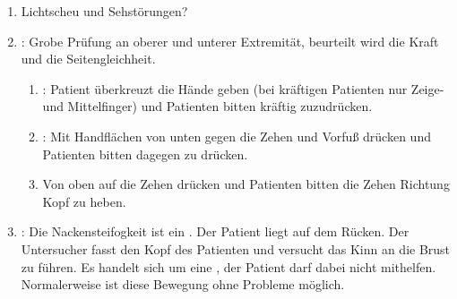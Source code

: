 {\begin{enumerate}
\begin{enumerate}
    Beurteilung von:
    \begin{enumerate}
      \item Schnelligkeit der Reaktion: prompt, verzögert?
      \item Reagieren immer beide
      Pupillen seitengleich 
      ()?
    \end{enumerate}
  \end{enumerate}
  \item Lichtscheu und Sehstörungen?
  \item {}: Grobe Prüfung an oberer und
  unterer Extremität, beurteilt wird die Kraft und die
  Seitengleichheit.
  \begin{enumerate}
    \item {}: 
    Patient überkreuzt die Hände geben 
    (bei kräftigen Patienten nur Zeige- und Mittelfinger) 
    und Patienten bitten kräftig zuzudrücken.
    \item {}: Mit Handflächen von unten gegen die Zehen und Vorfuß drücken
    und Patienten bitten dagegen zu
    drücken.
    \item Von oben auf die Zehen drücken und Patienten bitten
    die Zehen Richtung Kopf zu heben.
  \end{enumerate}
  \item
  \label{topic:nackensteifigkeit-untersuchung}:
  Die Nackensteifogkeit ist ein
  .
  Der Patient liegt  auf dem Rücken. Der
  Untersucher fasst den Kopf des Patienten und versucht das
  Kinn an die Brust zu führen. Es handelt sich um eine
  , der Patient darf dabei nicht
  mithelfen.
  Normalerweise ist diese Bewegung ohne Probleme möglich.
  

\end{enumerate}}
